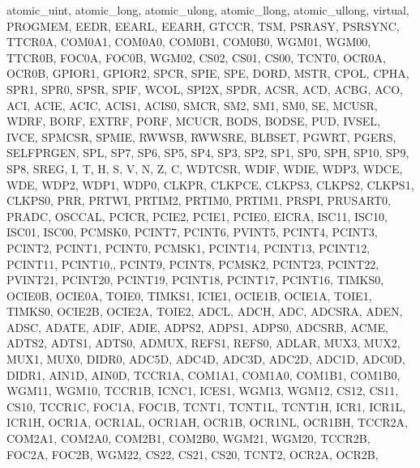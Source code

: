 {{                atomic_uint, atomic_long, atomic_ulong, atomic_llong, atomic_ullong, 
                virtual, PROGMEM,
                EEDR, EEARL, EEARH,
                GTCCR, TSM, PSRASY, PSRSYNC,
                TTCR0A, COM0A1, COM0A0, COM0B1, COM0B0, WGM01, WGM00,
                TTCR0B, FOC0A, FOC0B, WGM02, CS02, CS01, CS00,
                TCNT0, OCR0A, OCR0B,
                GPIOR1, GPIOR2,
                SPCR, SPIE, SPE, DORD, MSTR, CPOL, CPHA, SPR1, SPR0,
                SPSR, SPIF, WCOL, SPI2X,
                SPDR,
                ACSR, ACD, ACBG, ACO, ACI, ACIE, ACIC, ACIS1, ACIS0,
                SMCR, SM2, SM1, SM0, SE,
                MCUSR, WDRF, BORF, EXTRF, PORF,
                MCUCR, BODS, BODSE, PUD, IVSEL, IVCE,
                SPMCSR, SPMIE, RWWSB, RWWSRE, BLBSET, PGWRT, PGERS, SELFPRGEN,
                SPL, SP7, SP6, SP5, SP4, SP3, SP2, SP1, SP0, 
                SPH, SP10, SP9, SP8,
                SREG, I, T, H, S, V, N, Z, C,
                WDTCSR, WDIF, WDIE, WDP3, WDCE, WDE, WDP2, WDP1, WDP0,
                CLKPR, CLKPCE, CLKPS3, CLKPS2, CLKPS1, CLKPS0,
                PRR, PRTWI, PRTIM2, PRTIM0, PRTIM1, PRSPI, PRUSART0, PRADC,
                OSCCAL,
                PCICR, PCIE2, PCIE1, PCIE0,
                EICRA, ISC11, ISC10, ISC01, ISC00,
                PCMSK0, PCINT7, PCINT6, PVINT5, PCINT4, PCINT3, PCINT2, PCINT1, PCINT0,
                PCMSK1, PCINT14, PCINT13, PCINT12, PCINT11, PCINT10,, PCINT9, PCINT8,
                PCMSK2, PCINT23, PCINT22, PVINT21, PCINT20, PCINT19, PCINT18, PCINT17, PCINT16,
                TIMKS0, OCIE0B, OCIE0A, TOIE0,
                TIMKS1, ICIE1, OCIE1B, OCIE1A, TOIE1,
                TIMKS0, OCIE2B, OCIE2A, TOIE2,
                ADCL, ADCH, ADC,
                ADCSRA, ADEN, ADSC, ADATE, ADIF, ADIE, ADPS2, ADPS1, ADPS0,
                ADCSRB, ACME, ADTS2, ADTS1, ADTS0,
                ADMUX, REFS1, REFS0, ADLAR, MUX3, MUX2, MUX1, MUX0,
                DIDR0, ADC5D, ADC4D, ADC3D, ADC2D, ADC1D, ADC0D,
                DIDR1, AIN1D, AIN0D,
                TCCR1A, COM1A1, COM1A0, COM1B1, COM1B0, WGM11, WGM10,
                TCCR1B, ICNC1, ICES1, WGM13, WGM12, CS12, CS11, CS10,
                TCCR1C, FOC1A, FOC1B,
                TCNT1, TCNT1L, TCNT1H,
                ICR1, ICR1L, ICR1H,
                OCR1A, OCR1AL, OCR1AH,
                OCR1B, OCR1NL, OCR1BH,
                TCCR2A, COM2A1, COM2A0, COM2B1, COM2B0, WGM21, WGM20,
                TCCR2B, FOC2A, FOC2B, WGM22, CS22, CS21, CS20,
                TCNT2, OCR2A, OCR2B,
}}
